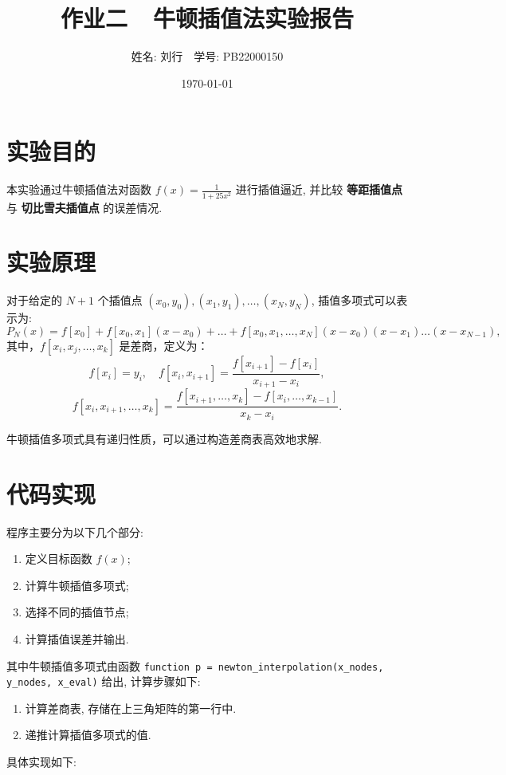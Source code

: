\documentclass[12pt]{article}
\title{作业二~~牛顿插值法实验报告}
\author{姓名: 刘行~~学号: PB22000150}
\date{\today}
\begin{document}
	\maketitle
	\section{实验目的}
		本实验通过牛顿插值法对函数 $f(x) = \frac{1}{1+25x^2}$ 进行插值逼近, 并比较 \textbf{等距插值点} 与 \textbf{切比雪夫插值点} 的误差情况.

	\section{实验原理}
		对于给定的 $N+1$ 个插值点 $(x_0, y_0), (x_1, y_1), \dots, (x_N, y_N)$, 插值多项式可以表示为:
		\begin{equation}
			P_N(x) = f[x_0] + f[x_0, x_1](x - x_0) + \dots + f[x_0, x_1, \dots, x_N](x - x_0)(x - x_1) \dots (x - x_{N-1}),
		\end{equation}
		其中，$f[x_i, x_j, \dots, x_k]$ 是差商，定义为：
		\begin{equation}
			f[x_i] = y_i, \quad f[x_i, x_{i+1}] = \frac{f[x_{i+1}] - f[x_i]}{x_{i+1} - x_i},
		\end{equation}
		\begin{equation}
			f[x_i, x_{i+1}, \dots, x_k] = \frac{f[x_{i+1}, \dots, x_k] - f[x_i, \dots, x_{k-1}]}{x_k - x_i}.
		\end{equation}
	
	牛顿插值多项式具有递归性质，可以通过构造差商表高效地求解.

	\section{代码实现}
		程序主要分为以下几个部分:
		\begin{enumerate}
			\item 定义目标函数 $f(x)$;
			\item 计算牛顿插值多项式;
			\item 选择不同的插值节点;
			\item 计算插值误差并输出.
		\end{enumerate}

		其中牛顿插值多项式由函数 \texttt{function p = newton\_interpolation(x\_nodes, y\_nodes, x\_eval)} 给出, 计算步骤如下:
		\begin{enumerate}
			\item 计算差商表, 存储在上三角矩阵的第一行中.
			\item 递推计算插值多项式的值.
		\end{enumerate} 具体实现如下:
\end{document}

